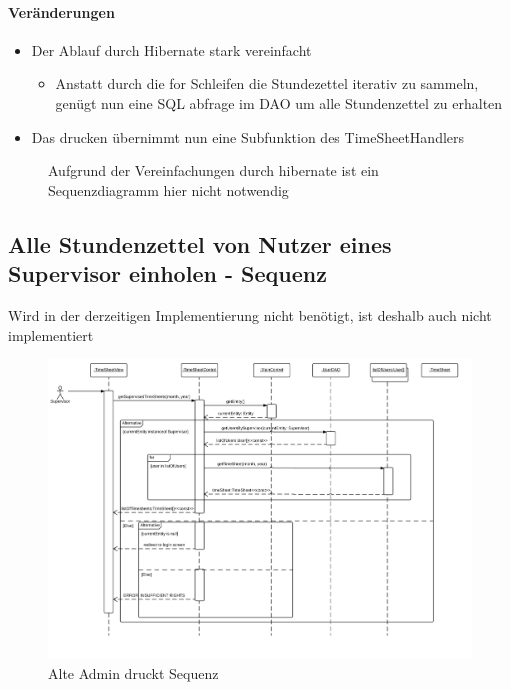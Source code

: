     \paragraph{Veränderungen}
    \begin{itemize}
        \item Der Ablauf durch Hibernate stark vereinfacht
        \begin{itemize}
            \item Anstatt durch die for Schleifen die Stundezettel iterativ zu sammeln, genügt nun eine SQL abfrage im DAO um alle Stundenzettel zu erhalten
        \end{itemize}
        \item Das drucken übernimmt nun eine Subfunktion des TimeSheetHandlers
    \end{itemize}

    \begin{figure}
      \centering
       \caption{Aufgrund der Vereinfachungen durch hibernate ist ein Sequenzdiagramm hier nicht notwendig}
    \end{figure}


    \subsection{Alle Stundenzettel von Nutzer eines Supervisor einholen - Sequenz}

        Wird in der derzeitigen Implementierung nicht benötigt, ist deshalb auch nicht implementiert
        \begin{figure}
          \centering
            \includegraphics[width=\linewidth]{Get-timesheets-of-all-supervised-users.pdf}
           \caption{Alte Admin druckt Sequenz}
        \end{figure}


